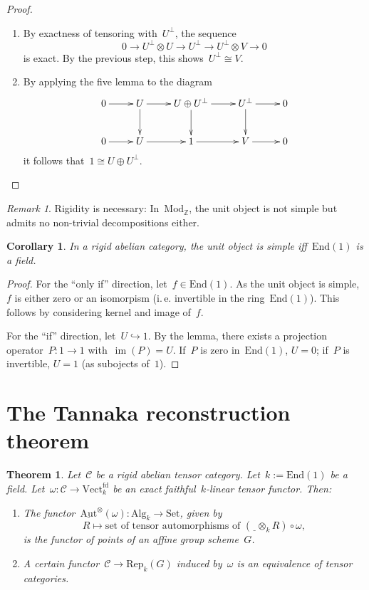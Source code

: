 \documentclass[a4paper,english,12pt]{scrartcl}
\theoremstyle{definition}
\theoremstyle{plain}
\newtheorem{thm}[defn]{Theorem}
\newtheorem{cor}[defn]{Corollary}
\theoremstyle{remark}
\newtheorem{rem}[defn]{Remark}
\newcommand{\ZZ}{\mathbb{Z}}
\newcommand{\C}{\mathcal{C}}
\renewcommand{\_}{\mathpunct{.}\,}
\newcommand{\?}{\,{:}\,}
\newcommand{\Mod}{\mathrm{Mod}}
\newcommand{\Set}{\mathrm{Set}}
\newcommand{\Vect}{\mathrm{Vect}}
\newcommand{\End}{\mathrm{End}}
\newcommand{\freist}{\underline{\ \ }}
\newcommand{\Rep}{\mathrm{Rep}}
\newcommand{\im}{\operatorname{im}}
\begin{document}
\begin{proof}
\begin{enumerate}
\item By exactness of tensoring with~$U^\perp$, the sequence
\[ 0 \longrightarrow U^\perp \otimes U \longrightarrow U^\perp \longrightarrow
U^\perp \otimes V \longrightarrow 0 \]
is exact. By the previous step, this shows~$U^\perp \cong V$.

\item By applying the five lemma to the diagram
\[ \xymatrix{
  0 \ar[r] & U \ar[r] \ar[d] & U \oplus U^\perp \ar[r] \ar[d] & U^\perp \ar[r] \ar[d] & 0 \\
  0 \ar[r] & U \ar[r] & 1 \ar[r] & V \ar[r] & 0
} \]
it follows that~$1 \cong U \oplus U^\perp$. \qedhere
\end{enumerate}
\end{proof}

\begin{rem}Rigidity is necessary: In~$\Mod_\ZZ$, the unit object is not simple
but admits no non-trivial decompositions either.\end{rem}

\begin{cor}In a rigid abelian category, the unit object is simple iff~$\End(1)$
is a field.\end{cor}
\begin{proof}For the ``only if'' direction, let~$f \in \End(1)$. As the unit
object is simple, $f$ is either zero or an isomorpism (i.\,e. invertible in the
ring~$\End(1)$). This follows by considering kernel and image of~$f$.

For the ``if'' direction, let~$U \hookrightarrow 1$. By the lemma, there exists
a projection operator~$P : 1 \to 1$ with~$\im(P) = U$. If~$P$ is zero
in~$\End(1)$, $U = 0$; if~$P$ is invertible, $U = 1$ (as subojects
of~$1$).\end{proof}


\section{The Tannaka reconstruction theorem}

\begin{thm}Let~$\C$ be a rigid abelian tensor category. Let~$k := \End(1)$ be a
field. Let~$\omega : \C \to \Vect_k^\mathrm{fd}$ be an exact faithful~$k$-linear
tensor functor. Then:
\begin{enumerate}
\item The functor~$\underline{\mathrm{Aut}}^\otimes(\omega) : \mathrm{Alg}_k
\to \Set$, given by
\[ R \longmapsto \text{set of tensor automorphisms of~$(\freist \otimes_k R)
\circ \omega$}, \]
is the functor of points of an affine group scheme~$G$.
\item A certain functor~$\C \to \Rep_k(G)$ induced by~$\omega$ is an
equivalence of tensor categories.
\end{enumerate}
\end{thm}
\end{document}
